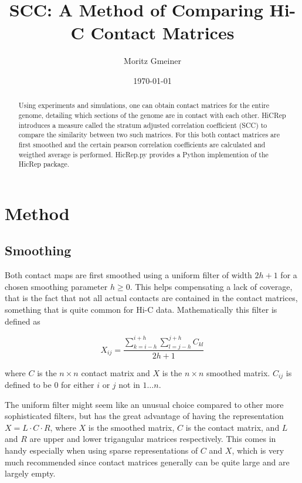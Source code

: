 \documentclass[10pt,abstract=true,titlepage=false,toc=bib]{scrartcl}
\title{SCC: A Method of Comparing Hi-C Contact Matrices}
\author{Moritz Gmeiner}
\date{\today}
\begin{document}
\maketitle

\begin{abstract}

Using experiments and simulations, one can obtain contact matrices for the entire genome, detailing which sections of the genome are in contact with each other. HiCRep\cite{yang_hicrep_2017} introduces a measure called the stratum adjusted correlation coefficient (SCC) to compare the similarity between two such matrices. For this both contact matrices are first smoothed and the certain pearson correlation coefficients are calculated and weigthed average is performed. HicRep.py\cite{lin_hicreppy_2021} provides a Python implemention of the HicRep package.

\end{abstract}

\section{Method} %
\label{sec:method}

\subsection{Smoothing} %
\label{subsec:smoothing}

Both contact maps are first smoothed using a uniform filter of width \(2h+1\) for a chosen smoothing parameter \(h \geq 0\). This helps compensating a lack of coverage, that is the fact that not all actual contacts are contained in the contact matrices, something that is quite common for Hi-C data. Mathematically this filter is defined as

\[
	X_{ij} = \frac{ \sum_{k=i-h}^{i+h} \sum_{l=j-h}^{j+h} C_{kl} }{ 2h+1 }
\]

where \(C\) is the \(n \times n\) contact matrix and \(X\) is the \(n \times n\) smoothed matrix. \(C_{ij}\) is defined to be 0 for either \(i\) or \(j\) not in \(1 \dots n\).

The uniform filter might seem like an unusual choice compared to other more sophisticated filters, but has the great advantage of having the representation \( X = L \cdot C \cdot R \), where \(X\) is the smoothed matrix, \(C\) is the contact matrix, and \(L\) and \(R\) are upper and lower trigangular matrices respectively. This comes in handy especially when using sparse representations of \(C\) and \(X\), which is very much recommended since contact matrices generally can be quite large and are largely empty.
\end{document}
